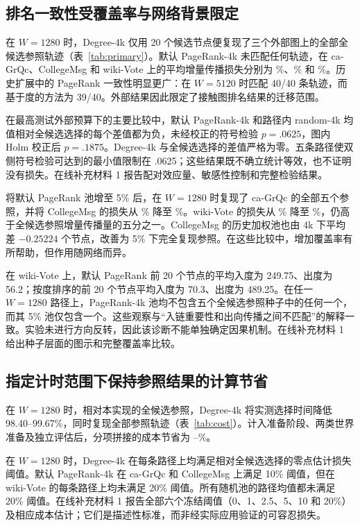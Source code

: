\documentclass[smallextended]{svjour3}
\begin{document}
\subsection{排名一致性受覆盖率与网络背景限定}
在 $W=1280$ 时，Degree-4k 仅用 20 个候选节点便复现了三个外部图上的全部全候选参照轨迹（表~\ref{tab:primary}）。默认 PageRank-4k 未匹配任何轨迹，在 ca-GrQc、CollegeMsg 和 wiki-Vote 上的平均增量传播损失分别为 \GrqcPRLoss{}\%、\CollegePRLoss{}\% 和 \WikiPRLoss{}\%。历史扩展中的 PageRank 一致性明显更广：在 $W=5120$ 时匹配 40/40 条轨迹，而基于度的方法为 39/40。外部结果因此限定了接触图排名结果的迁移范围。


在最高测试外部预算下的主要比较中，默认 PageRank-4k 和路径内 random-4k 均值相对全候选选择的每个差值都为负，未经校正的符号检验 $p=.0625$，图内 Holm 校正后 $p=.1875$。Degree-4k 与全候选选择的差值严格为零。五条路径使双侧符号检验可达到的最小值限制在 .0625；这些结果既不确立统计等效，也不证明没有损失。在线补充材料 1 报告配对效应量、敏感性控制和完整检验结果。

将默认 PageRank 池增至 5\% 后，在 $W=1280$ 时复现了 ca-GrQc 的全部五个参照，并将 CollegeMsg 的损失从 \CollegePRLoss{}\% 降至 \CollegePRfiveLoss{}\%。wiki-Vote 的损失从 \WikiPRLoss{}\% 降至 \WikiPRfiveLoss{}\%，仍高于全候选参照增量传播量的五分之一。CollegeMsg 的历史加权池也由 4k 下平均差 $-0.25224$ 个节点，改善为 5\% 下完全复现参照。在这些比较中，增加覆盖率有所帮助，但作用随网络而异。

在 wiki-Vote 上，默认 PageRank 前 20 个节点的平均入度为 249.75、出度为 56.2；按度排序的前 20 个节点平均入度为 70.3、出度为 489.25。在任一 $W=1280$ 路径上，PageRank-4k 池均不包含五个全候选参照种子中的任何一个，而其 5\% 池仅包含一个。这些观察与“入链重要性和出向传播之间不匹配”的解释一致。实验未进行方向反转，因此该诊断不能单独确定因果机制。在线补充材料 1 给出种子层面的图示和完整覆盖率比较。

\subsection{指定计时范围下保持参照结果的计算节省}
在 $W=1280$ 时，相对本实现的全候选参照，Degree-4k 将实测选择时间降低 98.40--99.67\%，同时复现全部参照轨迹（表~\ref{tab:cost}）。计入准备阶段、两类世界准备及独立评估后，分项拼接的成本节省为 \CollegeDegreeSaving{}--\WikiDegreeSaving{}\%。


在 $W=1280$ 时，Degree-4k 在每条路径上均满足相对全候选选择的零点估计损失阈值。默认 PageRank-4k 在 ca-GrQc 和 CollegeMsg 上满足 10\% 阈值，但在 wiki-Vote 的每条路径上均未满足 20\% 阈值。所有随机池的路径均值都未满足 20\% 阈值。在线补充材料 1 报告全部六个冻结阈值（0、1、2.5、5、10 和 20\%）及相应成本估计；它们是描述性标准，而非经实际应用验证的可容忍损失。
\end{document}
